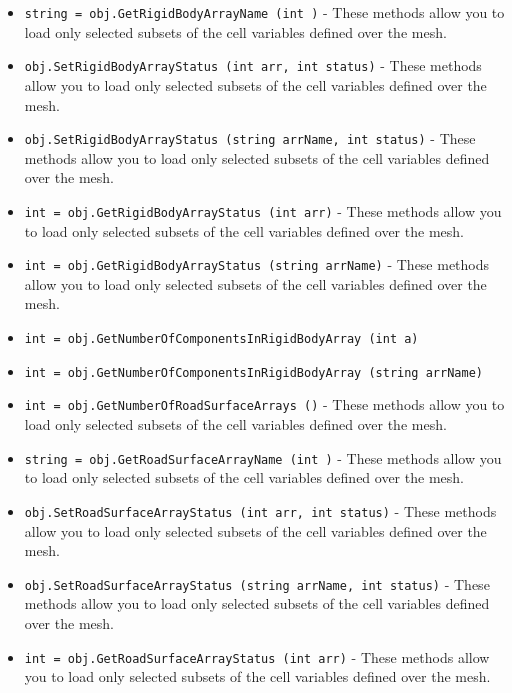 \begin{itemize}
\item  \verb|string = obj.GetRigidBodyArrayName (int )| -  These methods allow you to load only selected subsets of the cell
 variables defined over the mesh.

\item  \verb|obj.SetRigidBodyArrayStatus (int arr, int status)| -  These methods allow you to load only selected subsets of the cell
 variables defined over the mesh.

\item  \verb|obj.SetRigidBodyArrayStatus (string arrName, int status)| -  These methods allow you to load only selected subsets of the cell
 variables defined over the mesh.

\item  \verb|int = obj.GetRigidBodyArrayStatus (int arr)| -  These methods allow you to load only selected subsets of the cell
 variables defined over the mesh.

\item  \verb|int = obj.GetRigidBodyArrayStatus (string arrName)| -  These methods allow you to load only selected subsets of the cell
 variables defined over the mesh.

\item  \verb|int = obj.GetNumberOfComponentsInRigidBodyArray (int a)|

\item  \verb|int = obj.GetNumberOfComponentsInRigidBodyArray (string arrName)|

\item  \verb|int = obj.GetNumberOfRoadSurfaceArrays ()| -  These methods allow you to load only selected subsets of the cell
 variables defined over the mesh.

\item  \verb|string = obj.GetRoadSurfaceArrayName (int )| -  These methods allow you to load only selected subsets of the cell
 variables defined over the mesh.

\item  \verb|obj.SetRoadSurfaceArrayStatus (int arr, int status)| -  These methods allow you to load only selected subsets of the cell
 variables defined over the mesh.

\item  \verb|obj.SetRoadSurfaceArrayStatus (string arrName, int status)| -  These methods allow you to load only selected subsets of the cell
 variables defined over the mesh.

\item  \verb|int = obj.GetRoadSurfaceArrayStatus (int arr)| -  These methods allow you to load only selected subsets of the cell
 variables defined over the mesh.


\end{itemize}
